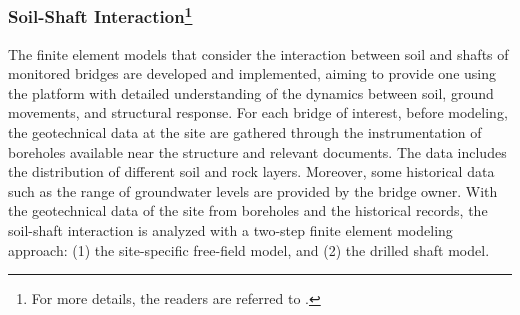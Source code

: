 
%

\subsubsection{Soil-Shaft Interaction\footnote{For more details, the readers are referred to \cite{reza2024, mohammadinumerical}.}}\label{sec:m2-SSI}
The finite element models that consider the interaction between soil and shafts of monitored bridges are developed and implemented, aiming to provide one using the platform with detailed understanding of the dynamics between soil, ground movements, and structural response.
For each bridge of interest, before modeling, the geotechnical data at the site are gathered through the instrumentation of boreholes available near the structure and relevant documents. The data includes the distribution of different soil and rock layers. 
Moreover, some historical data such as the range of groundwater levels are provided by the bridge owner. With the geotechnical data of the site from boreholes and the historical records, the soil-shaft interaction is analyzed with a two-step finite element modeling approach: (1) the site-specific free-field model, and (2) the drilled shaft model.

